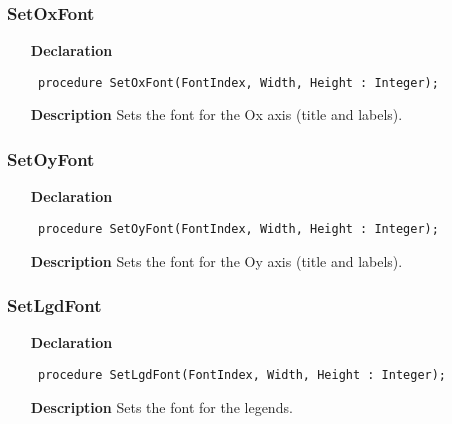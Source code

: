 \documentclass[12pt,a4paper,oneside]{report}
\newcommand{\declarationitem}[1]{\textbf{#1}}
\newcommand{\descriptiontitle}[1]{\textbf{#1}}
\newcommand{\code}[1]{\texttt{#1}}
\begin{document}
\subsubsection{SetOxFont}
\label{uplot-SetOxFont}
\begin{itemize}\item[\declarationitem{Declaration}\hfill]
	\begin{flushleft}
		\code{
			procedure SetOxFont(FontIndex, Width, Height : Integer);}
		
	\end{flushleft}
	
	\par
	\item[\descriptiontitle{Description}]
	Sets the font for the Ox axis (title and labels).
	
\end{itemize}
\subsubsection{SetOyFont}
\label{uplot-SetOyFont}
\begin{itemize}\item[\declarationitem{Declaration}\hfill]
	\begin{flushleft}
		\code{
			procedure SetOyFont(FontIndex, Width, Height : Integer);}
		
	\end{flushleft}
	
	\par
	\item[\descriptiontitle{Description}]
	Sets the font for the Oy axis (title and labels).
	
\end{itemize}
\subsubsection{SetLgdFont}
\label{uplot-SetLgdFont}
\begin{itemize}\item[\declarationitem{Declaration}\hfill]
	\begin{flushleft}
		\code{
			procedure SetLgdFont(FontIndex, Width, Height : Integer);}
		
	\end{flushleft}
	
	\par
	\item[\descriptiontitle{Description}]
	Sets the font for the legends.
	
\end{itemize}
\end{document}
